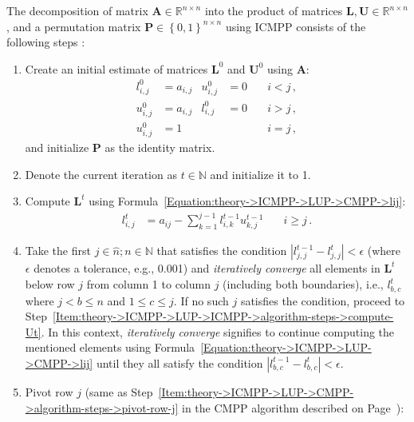 The decomposition of matrix $\mathbf{A} \in \mathbb{R}^{n \times n}$ into the product of matrices $\mathbf{L}, \mathbf{U} \in \mathbb{R}^{n \times n}$, and a permutation matrix $\mathbf{P} \in \left\{0,1\right\}^{n \times n}$ using ICMPP consists of the following steps \cite{Cejka2022}:

\begin{enumerate}
	\item Create an initial estimate of matrices $\mathbf{L}^{0}$ and $\mathbf{U}^{0}$ using $\mathbf{A}$:
		\begin{align}
			l_{i,j}^{0} &= a_{i,j} & u_{i,j}^{0} &= 0 \quad &i < j \nonumber\,, \\
			u_{i,j}^{0} &= a_{i,j} & l_{i,j}^{0} &= 0 \quad &i > j \nonumber\,, \\
			u_{i,j}^{0} &= 1	   &			 & \quad    &i = j \nonumber\,,
		\end{align}
		and initialize $\mathbf{P}$ as the identity matrix.
	\item Denote the current iteration as $t \in \mathbb{N}$ and initialize it to 1.
	\item \label{Item:theory->ICMPP->LUP->ICMPP->algorithm-steps->compute-Lt}
		Compute $\mathbf{L}^{t}$ using Formula~\ref{Equation:theory->ICMPP->LUP->CMPP->lij}:
		\begin{align}
			l_{i,j}^{t} &= a_{ij} - \sum_{k=1}^{j-1}l_{i,k}^{t-1}u_{k,j}^{t-1} &\quad i \geq j \nonumber\,.
		\end{align}
	\item \label{Item:theory->ICMPP->LUP->ICMPP->algorithm-steps->converge-lower-sections}
		Take the first $j \in \widehat{n}; n \in \mathbb{N}$ that satisfies the condition $\left|l^{t-1}_{j, j} - l^{t}_{j, j}\right| < \epsilon$ (where $\epsilon$ denotes a tolerance, e.g., 0.001) and \textit{iteratively converge} all elements in $\mathbf{L}^{t}$ below row $j$ from column 1 to column $j$ (including both boundaries), i.e., $l^{t}_{b, c}$ where $j < b \leq n$ and $1 \leq c \leq j$.
If no such $j$ satisfies the condition, proceed to Step~\ref{Item:theory->ICMPP->LUP->ICMPP->algorithm-steps->compute-Ut}.
In this context, \textit{iteratively converge} signifies to continue computing the mentioned elements using Formula~\ref{Equation:theory->ICMPP->LUP->CMPP->lij} until they all satisfy the condition $\left|l^{t-1}_{b, c} - l^{t}_{b, c}\right| < \epsilon$.
	\item \label{Item:theory->ICMPP->LUP->ICMPP->algorithm-steps->pivot-row}
		Pivot row $j$ (same as Step~\ref{Item:theory->ICMPP->LUP->CMPP->algorithm-steps->pivot-row-j} in the CMPP algorithm described on Page~\pageref{Item:theory->ICMPP->LUP->CMPP->algorithm-steps->pivot-row-j}):

\end{enumerate}
